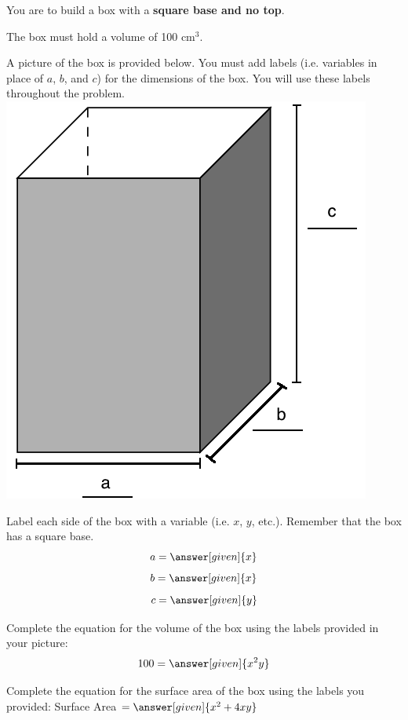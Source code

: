 \documentclass[handout]{ximera}
\begin{document}
\begin{problem}
You are to build a box with a \textbf{square base and no top}. 

The box must hold a volume of 100 cm$^3$. 

A picture of the box is provided below. You must add labels (i.e. variables in place of $a$, $b$, and $c$) for the dimensions of the box. You will use these labels throughout the problem.
\includegraphics[scale=0.25]{boxlabels.png} 

\begin{question}
Label each side of the box with a variable (i.e. $x$, $y$, etc.). Remember that the box has a square base.
    \[
	\displaystyle  a =    \answer[given]{x}
	\]
    \[
	\displaystyle  b =    \answer[given]{x}
	\]
    \[
	\displaystyle  c =    \answer[given]{y}
	\]
\end{question}

\begin{question}
Complete the equation for the volume of the box using the labels provided in your picture:
	\[
	\displaystyle  100 =    \answer[given]{x^{2}y}
	\] 
\end{question}

\begin{question}
Complete the equation for the surface area of the box using the labels you provided: 
	Surface Area $ =  \answer[given]{x^{2}+4xy}$
\end{question}


\end{problem}
\end{document}
